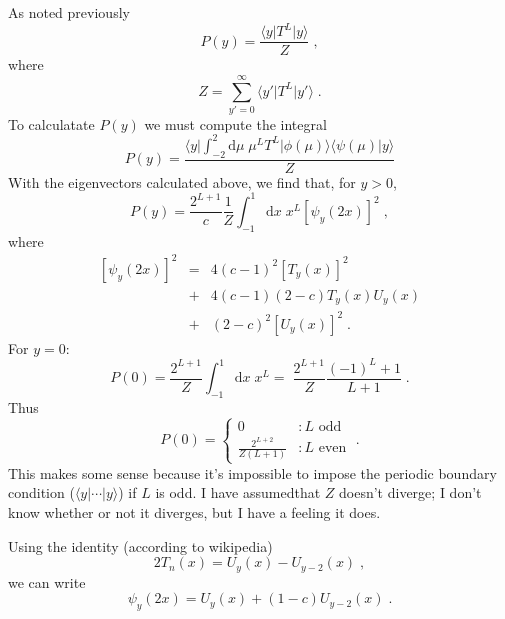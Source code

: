\documentclass[a4paper,10pt]{article}
\newcommand{\D}{\mathrm{d}}
\newcommand{\bra}[1]{\langle #1 \vert}
\newcommand{\ket}[1]{\vert #1 \rangle}
\newcommand{\braket}[2]{\langle #1 \vert #2 \rangle}
\begin{document}
As noted previously
\begin{equation}
  P(y) = \frac{ \bra{y} T^L \ket{y} }{ Z } \;,
\end{equation}
where
\begin{equation}
  Z = \sum_{y'=0}^\infty \bra{y'} T^L \ket{y'} \;.
\end{equation}
To calculatate $P(y)$ we must compute the integral
\begin{equation}
  P(y) = \frac{ \bra{y} \displaystyle\int_{-2}^2 \D \mu \; \mu^L T^L \ket{\phi(\mu)} \braket{\psi(\mu)}{y} }{ Z }
\end{equation}
With the eigenvectors calculated above, we find that, for $y>0$, 
\begin{equation}
  P(y) = \frac{ 2^{L+1}}{c} \frac{1}{ Z }\displaystyle\int_{-1}^1 \D x \; x^L \left[ \psi_y(2x) \right]^2 \;, 
\end{equation}
where
\begin{eqnarray}
  \left[ \psi_y(2x) \right]^2 & = & 4(c-1)^2 \left[ T_y(x) \right] ^2 \nonumber \\
			      & + & 4(c-1)(2-c) T_y(x)U_y(x) \nonumber \\
			      & + & (2-c)^2 \left[ U_y(x) \right]^2 \;.
\end{eqnarray}
For $y=0$:
\begin{equation}
  P(0) = \frac{ 2^{L+1}}{ Z }\displaystyle\int_{-1}^1 \D x \; x^L = \; \frac{ 2^{L+1}}{ Z } \frac{(-1)^L+1}{L+1} \;.
\end{equation}
Thus
\begin{equation}
  P(0) = \begin{cases}
	    0 & : L \mbox{ odd} \\
	    \frac{ 2^{L+2}}{ Z(L+1) }& : L \mbox{ even}
         \end{cases} \;.
\end{equation}
This makes some sense because it's impossible to impose the periodic boundary condition ($\bra{y} \cdots \ket{y}$) if $L$ is odd. I have assumedthat $Z$ doesn't diverge; I don't know whether or not it diverges, but I have a feeling it does.

Using the identity (according to wikipedia)
\begin{equation}
  2T_n(x) = U_y(x) - U_{y-2}(x) \;,
\end{equation}
we can write
\begin{equation}
  \psi_y(2x) = U_y(x) + (1-c) U_{y-2}(x) \;.
\end{equation}


\end{document}
